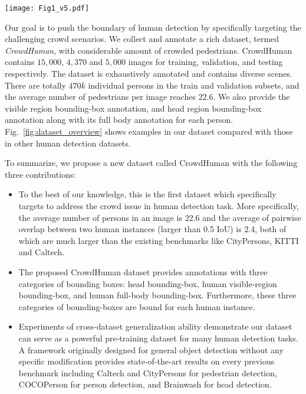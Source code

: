 \documentclass[10pt,twocolumn,letterpaper]{article}
\begin{document}
\begin{figure*}[thp]
\centering
\texttt{[image: Fig1\_v5.pdf]}
\caption{Illustrative examples from different human dataset benchmarks. The images inside the green, yellow, blue boxes are from the COCO~\cite{lin2014microsoft}, Caltech~\cite{dollar2009pedestrian}, and CityPersons~\cite{zhang2017citypersons} datasets, respectively. The images from the second row inside the red box are from our CrowdHuman benchmark with full body, visible body, and head bounding box annotations for each person.}
\label{fig:dataset_overview}
\end{figure*}


Our goal is to push the boundary of human detection by specifically targeting the challenging crowd scenarios. We collect and annotate a rich dataset,  termed \emph{CrowdHuman}, with considerable amount of crowded pedestrians. CrowdHuman contains $15,000$, $4,370$ and $5,000$ images for training, validation, and testing respectively. The dataset is exhaustively annotated and contains diverse scenes. There are totally $470k$ individual persons in the train and validation subsets, and the average number of pedestrians per image reaches $22.6$. We also provide the visible region bounding-box annotation, and head region bounding-box annotation along with its full body annotation for each person. Fig.~\ref{fig:dataset_overview} shows examples in our dataset compared with those in other human detection datasets.




To summarize, we propose a new dataset called CrowdHuman with the following three contributions:
\begin{itemize}
    \item To the best of our knowledge, this is the first dataset which specifically targets to address the crowd issue in human detection task. More specifically, the average number of persons in an image is $22.6$ and the average of pairwise overlap between two human instances (larger than 0.5 IoU) is 2.4, both of which are much larger than the existing benchmarks like CityPersons, KITTI and Caltech. 
    \item The proposed CrowdHuman dataset provides annotations with three categories of bounding boxes: head bounding-box, human visible-region bounding-box, and human full-body bounding-box. Furthermore, these three categories of bounding-boxes are bound for each human instance.
    \item Experiments of cross-dataset generalization ability demonstrate our dataset can serve as a powerful pre-training dataset for many human detection tasks. A framework originally designed for general object detection without any specific modification provides state-of-the-art results on every previous benchmark including Caltech and CityPersons for pedestrian detection, COCOPerson for person detection, and Brainwash for head detection.
\end{itemize}
\end{document}
